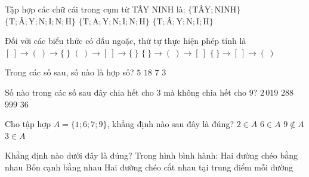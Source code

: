 \begin{ex}%
	Tập hợp các chữ cái trong cụm từ TÂY NINH là:
	\choice
	{$\{\text{TÂY}; \text{NINH}\}$}
	{$\{\text{T}; \text{Â}; \text{Y}; \text{N}; \text{I}; \text{N}; \text{H}\}$}
	{$\{\text{T}; \text{A}; \text{Y}; \text{N}; \text{I}; \text{N}; \text{H}\}$}
	{\True $\{\text{T}; \text{Â}; \text{Y}; \text{N}; \text{I}; \text{H}\}$}
\end{ex}

\begin{ex}%
	Đối với các biểu thức có dấu ngoặc, thứ tự thực hiện phép tính là
	\choice
	{$[\ ] \to (\ ) \to \{\ \}$}
	{\True $(\ ) \to [\ ] \to \{\ \}$}
	{$\{\ \} \to (\ ) \to [\ ]$}
	{$\{\ \} \to [\ ] \to (\ )$}
\end{ex}

\begin{ex}%
	Trong các số sau, số nào là hợp số?
	\choice
	{$5$}
	{\True $18$}
	{$7$}
	{$3$}
\end{ex}

\begin{ex}%
	Số nào trong các số sau đây chia hết cho $3$ mà không chia hết cho $9$?
	\choice
	{\True $2\,019$}
	{$288$}
	{$999$}
	{$36$}
\end{ex}

\begin{ex}%
	Cho tập hợp $A = \{1; 6; 7; 9\}$, khẳng định nào sau đây là đúng?
	\choice
	{$2 \in A$}
	{\True $6 \in A$}
	{$9 \notin A$}
	{$3 \in A$}
\end{ex}

\begin{ex}%
	Khẳng định nào dưới đây là đúng? Trong hình bình hành:
	{Hai đường chéo bằng nhau}
	{Bốn cạnh bằng nhau}
	{\True Hai đường chéo cắt nhau tại trung điểm mỗi đường}
\end{ex}

